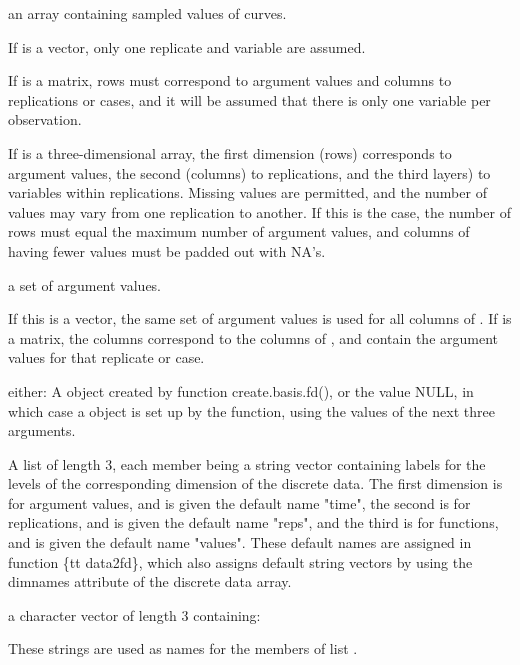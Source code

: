 \documentclass{article}
\begin{document}
\begin{Arguments}
\begin{ldescription}
\item[\code{y}] an array containing sampled values of curves.

If  is a vector, only one replicate and variable are
assumed.

If  is a matrix, rows must correspond to argument values and
columns to replications or cases, and it will be assumed that there
is only one variable per observation.

If  is a three-dimensional array, the first dimension (rows)
corresponds to argument values, the second (columns) to
replications, and the third layers) to variables within
replications.  Missing values are permitted, and the number of
values may vary from one replication to another.  If this is the
case, the number of rows must equal the maximum number of argument
values, and columns of  having fewer values must be padded
out with NA's. 

\item[\code{argvals}] a set of argument values.

If this is a vector, the same set of argument values is used for all
columns of .  If  is a matrix, the columns
correspond to the columns of , and contain the argument
values for that replicate or case.    

\item[\code{basisobj}] either:  A  object created by function
create.basis.fd(), 
or the value NULL, in which case a  object is set up
by the function, using the values of the next three arguments.

\item[\code{fdnames}] A list of length 3, each member being a string vector containing
labels for the levels of the corresponding dimension of the discrete
data.  The first dimension is for argument values, and is given the
default name "time", the second is for replications, and is given
the default name "reps", and the third is for functions, and is
given the default name "values".  These default names are
assigned in function \{tt data2fd\}, which also assigns default
string vectors by using the dimnames attribute of the discrete data
array. 

\item[\code{argnames}] a character vector of length 3 containing:


These strings are used as names for the members of list .

\end{ldescription}
\end{Arguments}
\end{document}
